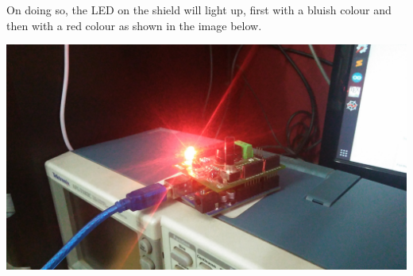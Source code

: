 \documentclass{hitec}
\begin{document}
On doing so, the LED on the shield will light up, first with a bluish colour and then with a red colour as shown in the image below. 




\includegraphics[scale=0.1]{Shield_With_Code.jpg}
\end{document}
